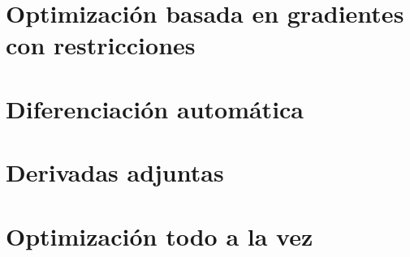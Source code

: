 \section{Optimización basada en gradientes con restricciones}


\clearpage
\section{Diferenciación automática}


\clearpage
\section{Derivadas adjuntas}
\label{sec:adjoints}


\clearpage
\section{Optimización todo a la vez}

